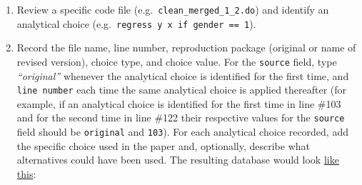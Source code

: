 \documentclass[
]{book}
\begin{document}
\begin{enumerate}
\def\labelenumi{\arabic{enumi}.}
\item
  Review a specific code file (e.g.~\texttt{clean\_merged\_1\_2.do}) and identify an analytical choice (e.g.~\texttt{regress\ y\ x\ if\ gender\ ==\ 1}).
\item
  Record the file name, line number, reproduction package (original or name of revised version), choice type, and choice value. For the \texttt{source} field, type \emph{``original''} whenever the analytical choice is identified for the first time, and \texttt{line\ number} each time the same analytical choice is applied thereafter (for example, if an analytical choice is identified for the first time in line \#103 and for the second time in line \#122 their respective values for the \texttt{source} field should be \texttt{original} and \texttt{103}). For each analytical choice recorded, add the specific choice used in the paper and, optionally, describe what alternatives could have been used. The resulting database would look \href{https://docs.google.com/spreadsheets/d/1nZuJSHswbZgaaIfBcyIUGPwG-WIP8zE1Oambud-WoDc/edit?usp=sharing}{like this}:
\end{enumerate}
\end{document}
